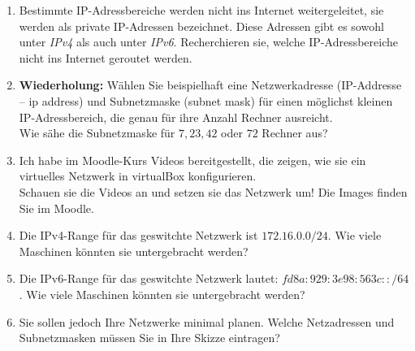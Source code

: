 \documentclass[paper=a4,fontsize=11pt]{scrartcl}%
\numberwithin{equation}{section}
\begin{document}
\begin{enumerate}
\begin{enumerate}
		\item Bestimmte IP-Adressbereiche werden nicht ins Internet weitergeleitet, sie werden als private IP-Adressen bezeichnet. Diese Adressen gibt es sowohl unter \emph{IPv4} als auch unter \emph{IPv6}. Recherchieren sie, welche IP-Adressbereiche nicht ins Internet geroutet werden.
		\item \textbf{Wiederholung:} Wählen Sie beispielhaft eine Netzwerkadresse (IP-Addresse -- ip address) und Subnetzmaske (subnet mask) für einen möglichst kleinen IP-Adressbereich, die genau für ihre Anzahl Rechner ausreicht.\\
		Wie sähe die Subnetzmaske für $7, 23, 42$ oder $72$ Rechner aus? 
		\item Ich habe im Moodle-Kurs Videos bereitgestellt, die zeigen, wie sie ein virtuelles Netzwerk in virtualBox konfigurieren.\\
		Schauen sie die Videos an und setzen sie das Netzwerk um! Die Images finden Sie im Moodle.
		\item Die IPv4-Range für das geswitchte Netzwerk ist $172.16.0.0/24$. Wie viele Maschinen könnten sie untergebracht werden? 
		\item Die IPv6-Range für das geswitchte Netzwerk lautet: $fd8a:929:3e98:563c::/64$. Wie viele Maschinen könnten sie untergebracht werden?
		\item Sie sollen jedoch Ihre Netzwerke minimal planen. Welche Netzadressen und Subnetzmasken müssen Sie in Ihre Skizze eintragen?
	\end{enumerate}
\end{enumerate}
\end{document}
